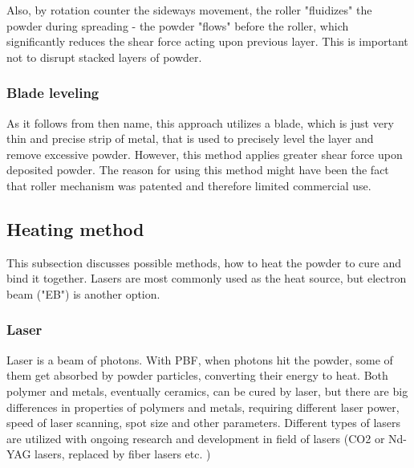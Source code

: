 \documentclass[a4paper, twoside, 11pt]{report}
\begin{document}
Also, by rotation counter the sideways movement, the roller "fluidizes" the powder during spreading - the powder "flows" before the roller, which significantly reduces the shear force acting upon previous layer. This is important not to disrupt stacked layers of powder.
\subsubsection{Blade leveling}
As it follows from then name, this approach utilizes a blade, which is just very thin and precise strip of metal, that is used to precisely level the layer and remove excessive powder. However, this method applies greater shear force upon deposited powder. The reason for using this method might have been the fact that roller mechanism was patented and therefore limited commercial use.

\subsection{Heating method}
This subsection discusses possible methods, how to heat the powder to cure and bind it together. Lasers are most commonly used as the heat source, but electron beam ("EB") is another option.
\subsubsection{Laser}
Laser is a beam of photons. With PBF, when photons hit the powder, some of them get absorbed by powder particles, converting their energy to heat. Both polymer and metals, eventually ceramics, can be cured by laser, but there are big differences in properties of polymers and metals, requiring different laser power, speed of laser scanning, spot size and other parameters. Different types of lasers are utilized with ongoing research and development in field of lasers (CO2 or Nd-YAG lasers, replaced by fiber lasers etc. \cite[p. 252]{AMT})
\end{document}
